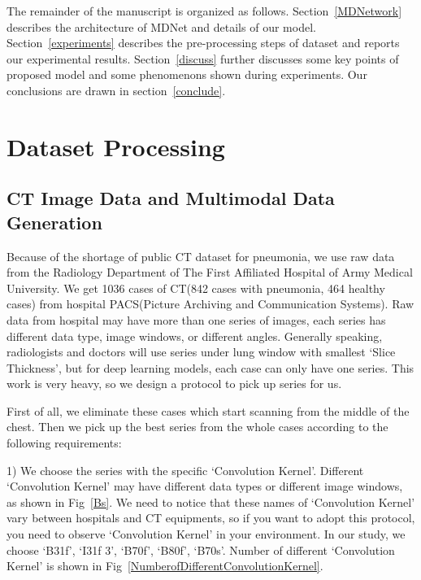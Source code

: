 \documentclass[journal]{IEEEtran}
\begin{document}
The remainder of the manuscript is organized as follows. 
Section~\ref{MDNetwork} describes the architecture of MDNet and details of our model.
Section~\ref{experiments} describes the pre-processing steps of dataset and reports our experimental results.
Section~\ref{discuss} further discusses some key points of proposed model and some phenomenons shown during experiments.
Our conclusions are drawn in section~\ref{conclude}.


\section{Dataset Processing}
\label{datasetprocessing}
\subsection{CT Image Data and Multimodal Data Generation}
\label{ctimagedata}
Because of the shortage of public CT dataset for pneumonia, we use raw data from the Radiology Department of The First Affiliated Hospital of Army Medical University. We get 1036 cases of CT(842 cases with pneumonia, 464 healthy cases) from hospital PACS(Picture Archiving and Communication Systems). Raw data from hospital may have more than one series of images, each series has different data type, image windows, or different angles. 
Generally speaking, radiologists and doctors will use series under lung window with smallest `Slice Thickness', but for deep learning models, each case can only have one series. This work is very heavy, so we design a protocol to pick up series for us.

First of all, we eliminate these cases which start scanning from the middle of the chest. Then we pick up the best series from the whole cases according to the following requirements:

1) We choose the series with the specific `Convolution Kernel'. Different `Convolution Kernel' may have different data types or different image windows, as shown in Fig~\ref{Bs}. We need to notice that these names of `Convolution Kernel' vary between hospitals and CT equipments, so if you want to adopt this protocol, you need to observe `Convolution Kernel' in your environment. In our study, we choose `B31f', `I31f 3', `B70f', `B80f', `B70s'. Number of different `Convolution Kernel' is shown in Fig~\ref{NumberofDifferentConvolutionKernel}. 
\end{document}
